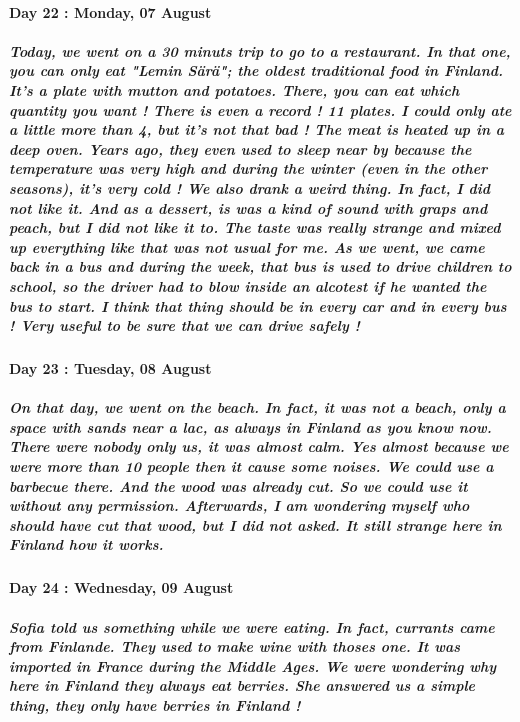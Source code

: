 \documentclass[a4paper,12pt]{report} %
\begin{document}
\paragraph{Day 22 : Monday, 07 August}
\subparagraph{Today, we went on a 30 minuts trip to go to a restaurant. In that one, you can only eat "Lemin Särä"; the oldest traditional food in Finland. It's a plate with mutton and potatoes. There, you can eat which quantity you want ! There is even a record ! 11 plates. I could only ate a little more than 4, but it's not that bad ! The meat is heated up in a deep oven. Years ago, they even used to sleep near by because the temperature was very high and during the winter (even in the other seasons), it's very cold ! We also drank a weird thing. In fact, I did not like it. And as a dessert, is was a kind of sound with graps and peach, but I did not like it to. The taste was really strange and mixed up everything like that was not usual for me. As we went, we came back in a bus and during the week, that bus is used to drive children to school, so the driver had to blow inside an alcotest if he wanted the bus to start. I think that thing should be in every car and in every bus ! Very useful to be sure that we can drive safely !}

\paragraph{Day 23 : Tuesday, 08 August}
\subparagraph{On that day, we went on the beach. In fact, it was not a beach, only a space with sands near a lac, as always in Finland as you know now. There were nobody only us, it was almost calm. Yes almost because we were more than 10 people then it cause some noises. We could use a barbecue there. And the wood was already cut. So we could use it without any permission. Afterwards, I am wondering myself who should have cut that wood, but I did not asked. It still strange here in Finland how it works.}

\paragraph{Day 24 : Wednesday, 09 August}
\subparagraph{Sofia told us something while we were eating. In fact, currants came from Finlande. They used to make wine with thoses one. It was imported in France during the Middle Ages. We were wondering why here in Finland they always eat berries. She answered us a simple thing, they only have berries in Finland !}
\end{document}
